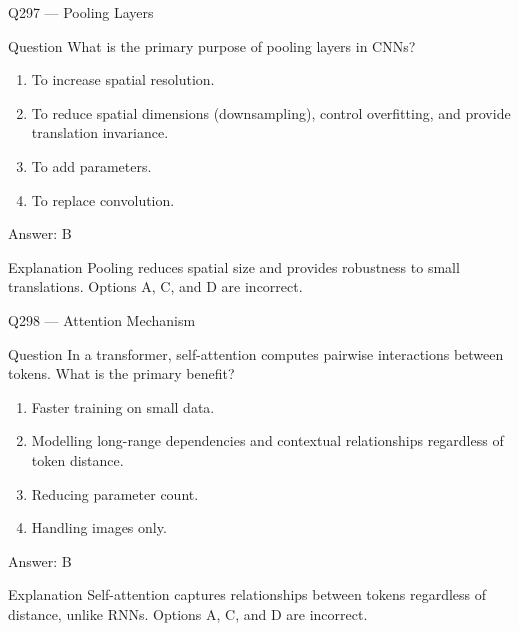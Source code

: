 \documentclass[aspectratio=169,8pt]{beamer}
\begin{document}
\begin{frame}{Q297 --- Pooling Layers}
\begin{block}{Question}
What is the primary purpose of pooling layers in CNNs?
\begin{enumerate}
\item To increase spatial resolution.
\item To reduce spatial dimensions (downsampling), control overfitting, and provide translation invariance.
\item To add parameters.
\item To replace convolution.
\end{enumerate} \end{block}
\begin{exampleblock}{Answer: B}\end{exampleblock}
\begin{block}{Explanation}
Pooling reduces spatial size and provides robustness to small translations. Options A, C, and D are incorrect.
\end{block}
\end{frame}

\begin{frame}{Q298 --- Attention Mechanism}
\begin{block}{Question}
In a transformer, self-attention computes pairwise interactions between tokens. What is the primary benefit?
\begin{enumerate}
\item Faster training on small data.
\item Modelling long-range dependencies and contextual relationships regardless of token distance.
\item Reducing parameter count.
\item Handling images only.
\end{enumerate}\end{block}
\begin{exampleblock}{Answer: B}\end{exampleblock}
\begin{block}{Explanation}
Self-attention captures relationships between tokens regardless of distance, unlike RNNs. Options A, C, and D are incorrect.
\end{block}
\end{frame}
\end{document}
